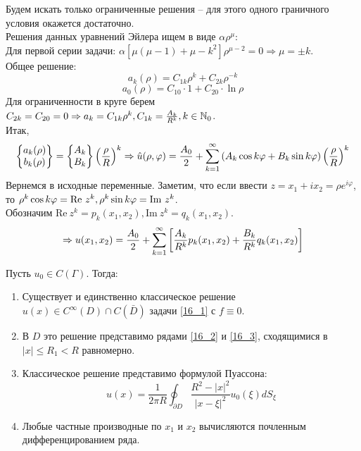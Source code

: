 Будем искать только ограниченные решения -- для этого одного граничного условия окажется достаточно.\\
Решения данных уравнений Эйлера ищем в виде $\alpha \rho^\mu$:\\
Для первой серии задачи: $\alpha[\mu(\mu-1)+\mu - k^2] \rho^{\mu-2} = 0 \Rightarrow \mu = \pm k$.\\
Общее решение:
$$ a_k(\rho) = C_{1k}\rho^k+C_{2k}\rho^{-k} $$
$$a_0(\rho) = C_{10} \cdot 1 + C_{20} \cdot \ln \rho$$
Для ограниченности в круге берем $C_{2k} = C_{20} = 0 \Rightarrow a_k = C_{1k} \rho^k, C_{1k} = \frac{A_k}{R^k}, k \in \mathbb{N}_0$.\\
Итак, 
\begin{equation}\label{16_2}
\left\{\begin{matrix} a_k(\rho)\\ b_k(\rho) \end{matrix}\right\} = \left\{\begin{matrix} A_k\\ B_k \end{matrix}\right\}\left(\frac{\rho}{R}\right)^k \Rightarrow \hat u(\rho, \varphi) = \frac{A_0}{2} + \sum_{k=1}^{\infty}\left(A_k \cos k \varphi + B_k \sin k \varphi\right) \left(\frac{\rho}{R}\right)^k  
\end{equation}
Вернемся в исходные переменные. Заметим, что если ввести $z = x_1+ix_2 = \rho e^{i \varphi}$, то $\rho^k \cos k \varphi = \mathrm{Re} \ z^k,\\ \rho^k \sin k \varphi = \mathrm{Im} \ z^k$.\\ Обозначим $\mathrm{Re} \ z^k = p_k(x_1,x_2), \mathrm{Im} \ z^k = q_k(x_1,x_2)$.
\begin{equation} \label{16_3}
\Rightarrow u(x_1,x_2) = \frac{A_0}{2}+ \sum_{k=1}^{\infty}\left[\frac{A_k}{R^k} p_k(x_1,x_2) + \frac{B_k}{R^k} q_k(x_1,x_2)\right] 
\end{equation}
\begin{theorem}
Пусть $u_0 \in C(\Gamma)$. Тогда:
\begin{enumerate}
\item Существует и единственно классическое решение $u(x) \in C^\infty(D) \cap C(\bar D)$ задачи \ref{16_1} с $f \equiv 0$.
\item В $D$ это решение представимо рядами \ref{16_2} и \ref{16_3}, сходящимися в $|x| \leq R_1 < R$ равномерно.
\item Классическое решение представимо формулой Пуассона: \[u(x) = \frac{1}{2\pi R} \oint_{\partial D} \frac{R^2 - |x|^2}{|x- \xi|^2}u_0(\xi) dS_\xi\]
\item Любые частные производные по $x_1$ и $x_2$ вычисляются почленным дифференцированием ряда.
\end{enumerate}
\end{theorem}
